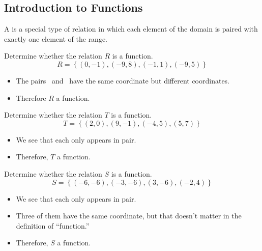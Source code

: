\subsection{Introduction to Functions} 
\begin{definition}[Function]
A  is a special type of relation in which each element of the domain is paired with exactly one element of the range.
\end{definition}
\begin{Example}
Determine whether the relation $R$ is a function.
\[
R=\left\{(0,-1),(-9,8),(-1,1),(-9,5)\right\}
\]
\begin{itemize}
\item The pairs \blankpair\ and \blankpair\ have the same \makeblanksmall coordinate but different \makeblanksmall coordinates.
\item Therefore $R$ \makeblank[1in] a function.
\end{itemize}
\end{Example}
\begin{Example}
Determine whether the relation $T$ is a function.
\[
T=\left\{(2,0),(9,-1),(-4,5),(5,7)\right\}
\]
\begin{itemize}
\item We see that each \makeblanksmall only appears in \makeblank[1in] pair.
\item Therefore, $T$ \makeblank[1in] a function.
\end{itemize}
\end{Example}
\begin{Example}
Determine whether the relation $S$ is a function.
\[
S=\left\{(-6,-6),(-3,-6),(3,-6),(-2,4)\right\}
\]
\begin{itemize}
\item We see that each \makeblanksmall only appears in \makeblank[1in] pair.
\item Three of them have the same \makeblanksmall coordinate, but that doesn't matter in the definition of ``function.''
\item Therefore, $S$ \makeblank[1in] a function.
\end{itemize}
\end{Example}
